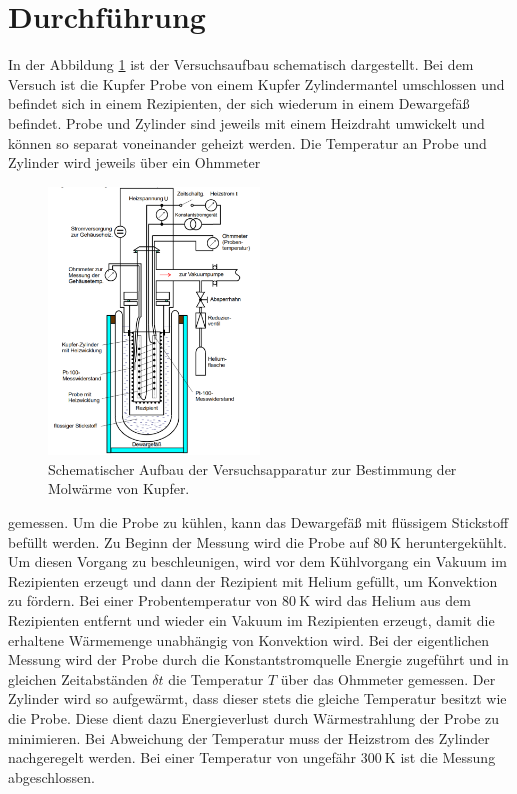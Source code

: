 \newpage
\section{Durchführung}
\label{sec:Durchführung}
In der Abbildung \ref{fig:aufbau} ist der Versuchsaufbau schematisch
dargestellt.
Bei dem Versuch ist die Kupfer Probe von einem Kupfer Zylindermantel
umschlossen und
befindet sich
in einem Rezipienten, der sich wiederum in einem
Dewargefäß befindet. Probe und Zylinder
sind jeweils mit einem Heizdraht umwickelt und können so
separat voneinander geheizt werden.
Die Temperatur an Probe und Zylinder wird jeweils über ein Ohmmeter
\begin{figure}
  \centering
  \includegraphics[width=0.5\textwidth]{Aufbau.PNG}
  \caption{Schematischer Aufbau der Versuchsapparatur zur Bestimmung der Molwärme von Kupfer. \cite{sample}}
  \label{fig:aufbau}
\end{figure}
gemessen.
Um die Probe
zu kühlen, kann das Dewargefäß mit flüssigem Stickstoff
befüllt werden.
Zu Beginn der Messung wird die Probe auf $\SI{80}{\kelvin}$
heruntergekühlt.
Um diesen Vorgang zu beschleunigen, wird vor dem Kühlvorgang ein Vakuum im Rezipienten erzeugt und dann der Rezipient mit Helium
gefüllt, um Konvektion zu fördern. Bei einer Probentemperatur von $\SI{80}{\kelvin}$ wird das Helium aus dem
Rezipienten entfernt und wieder ein
Vakuum im Rezipienten
erzeugt, damit die erhaltene Wärmemenge unabhängig von Konvektion wird.
Bei der eigentlichen Messung wird der Probe durch die Konstantstromquelle
Energie zugeführt und
in gleichen Zeitabständen $\delta t$
die Temperatur $T$ über das Ohmmeter gemessen.
Der Zylinder wird so aufgewärmt, dass
dieser stets die gleiche Temperatur
besitzt wie die Probe.
Diese dient dazu Energieverlust
durch Wärmestrahlung der Probe zu minimieren.
Bei Abweichung der Temperatur muss der Heizstrom des Zylinder
nachgeregelt werden. Bei einer Temperatur von ungefähr $\SI{300}{\kelvin}$
ist die Messung abgeschlossen.
